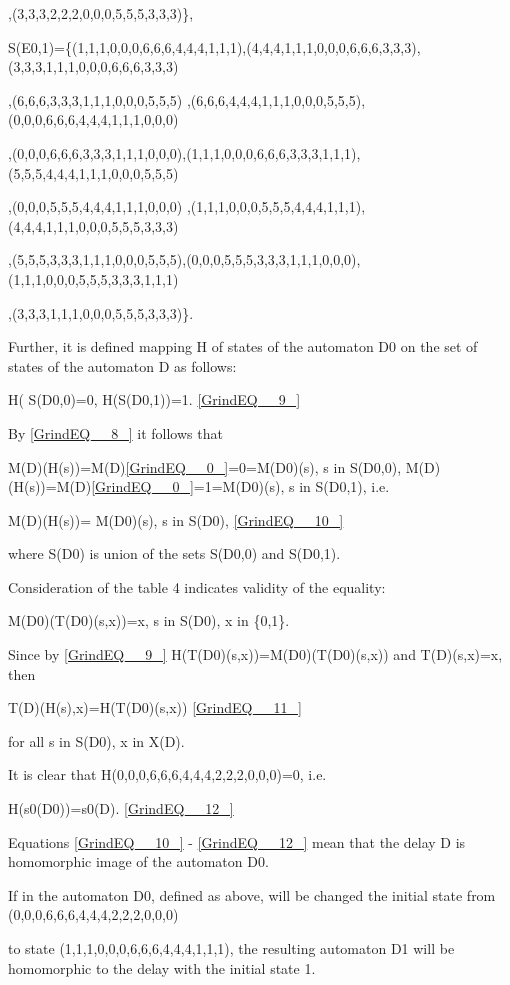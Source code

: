 \documentclass{article}
\begin{document}
 ,(3,3,3,2,2,2,0,0,0,5,5,5,3,3,3)\},

S(E0,1)=\{(1,1,1,0,0,0,6,6,6,4,4,4,1,1,1),(4,4,4,1,1,1,0,0,0,6,6,6,3,3,3),(3,3,3,1,1,1,0,0,0,6,6,6,3,3,3)

 ,(6,6,6,3,3,3,1,1,1,0,0,0,5,5,5) ,(6,6,6,4,4,4,1,1,1,0,0,0,5,5,5),(0,0,0,6,6,6,4,4,4,1,1,1,0,0,0)

 ,(0,0,0,6,6,6,3,3,3,1,1,1,0,0,0),(1,1,1,0,0,0,6,6,6,3,3,3,1,1,1),(5,5,5,4,4,4,1,1,1,0,0,0,5,5,5)

 ,(0,0,0,5,5,5,4,4,4,1,1,1,0,0,0) ,(1,1,1,0,0,0,5,5,5,4,4,4,1,1,1),(4,4,4,1,1,1,0,0,0,5,5,5,3,3,3)

 ,(5,5,5,3,3,3,1,1,1,0,0,0,5,5,5),(0,0,0,5,5,5,3,3,3,1,1,1,0,0,0),(1,1,1,0,0,0,5,5,5,3,3,3,1,1,1)

 ,(3,3,3,1,1,1,0,0,0,5,5,5,3,3,3)\}.

Further, it is defined mapping H of states of the automaton D0 on the set of states of the automaton D as follows:

H( S(D0,0)=0, H(S(D0,1))=1. \eqref{GrindEQ__9_}

By \eqref{GrindEQ__8_} it follows that

M(D)(H(s))=M(D)\eqref{GrindEQ__0_}=0=M(D0)(s), s in S(D0,0), M(D)(H(s))=M(D)\eqref{GrindEQ__0_}=1=M(D0)(s), s in S(D0,1), i.e.

M(D)(H(s))= M(D0)(s), s in S(D0), \eqref{GrindEQ__10_}

where S(D0) is union of the sets S(D0,0) and S(D0,1).

 Consideration of the table 4 indicates validity of the equality:

M(D0)(T(D0)(s,x))=x, s in S(D0), x in \{0,1\}.

Since by \eqref{GrindEQ__9_} H(T(D0)(s,x))=M(D0)(T(D0)(s,x)) and T(D)(s,x)=x, then

T(D)(H(s),x)=H(T(D0)(s,x))   \eqref{GrindEQ__11_}

for all s in S(D0), x in X(D).

It is clear that H(0,0,0,6,6,6,4,4,4,2,2,2,0,0,0)=0, i.e.

H(s0(D0))=s0(D).  \eqref{GrindEQ__12_}

Equations \eqref{GrindEQ__10_} - \eqref{GrindEQ__12_} mean that the delay D is homomorphic image of the automaton D0.

If in the automaton D0, defined as above, will be changed the initial state from (0,0,0,6,6,6,4,4,4,2,2,2,0,0,0)

to state (1,1,1,0,0,0,6,6,6,4,4,4,1,1,1), the resulting automaton D1 will be homomorphic to the delay with the initial state 1.
\end{document}
